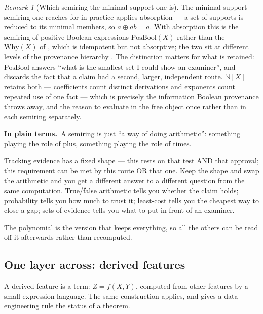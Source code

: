 \documentclass[11pt,a4paper]{article}
\renewcommand{\_}{\oldunderscore\allowbreak}
\theoremstyle{plain}
\theoremstyle{definition}
\theoremstyle{definition}
\theoremstyle{remark}
\newtheorem{remark}[theorem]{Remark}
\newcommand{\Nat}{\mathbb{N}}
\newcommand{\pt}{\textbf{In plain terms.}\ }
\begin{document}
\begin{remark}[Which semiring the minimal-support one is]
The minimal-support semiring one reaches for in practice applies absorption --- a set of supports is
reduced to its minimal members, so $a \oplus ab = a$. With absorption this is the semiring of positive Boolean expressions
$\mathrm{PosBool}(X)$ rather than the $\mathrm{Why}(X)$ of \cite{buneman2001}, which is idempotent but not
absorptive; the two sit at different levels of the provenance hierarchy \cite{green2007,cheney2009}. The
distinction matters for what is retained: $\mathrm{PosBool}$ answers ``what is the smallest set I could
show an examiner'', and discards the fact that a claim had a second, larger, independent route.
$\Nat[X]$ retains both --- coefficients count distinct derivations and exponents count repeated use of one
fact --- which is precisely the information Boolean provenance throws away, and the reason to evaluate in
the free object once rather than in each semiring separately.
\end{remark}

\begin{plain}
\pt A semiring is just ``a way of doing arithmetic'': something playing the role of plus, something
playing the role of times.

Tracking evidence has a fixed shape --- this rests on that test AND that approval; this requirement can be
met by this route OR that one. Keep the shape and swap the arithmetic and you get a different answer to a
different question from the same computation. True/false arithmetic tells you whether the claim holds;
probability tells you how much to trust it; least-cost tells you the cheapest way to close a gap;
sets-of-evidence tells you what to put in front of an examiner.

The polynomial is the version that keeps everything, so all the others can be read off it afterwards
rather than recomputed.
\end{plain}

\subsection{One layer across: derived features}

A derived feature is a term: $Z = f(X,Y)$, computed from other features by a small expression language.
The same construction applies, and gives a data-engineering rule the status of a theorem.
\end{document}
